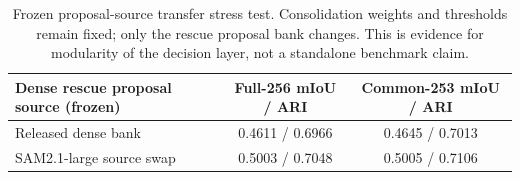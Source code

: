 \begin{table}[t]
\centering
\scriptsize
\begin{tabularx}{\textwidth}{@{}Xcc@{}}
\toprule
Dense rescue proposal source (frozen) & Full-256 mIoU / ARI & Common-253 mIoU / ARI \\
\midrule
Released dense bank & 0.4611 / 0.6966 & 0.4645 / 0.7013 \\
SAM2.1-large source swap & 0.5003 / 0.7048 & 0.5005 / 0.7106 \\
\bottomrule
\end{tabularx}
\caption{Frozen proposal-source transfer stress test. Consolidation weights and thresholds remain fixed; only the rescue proposal bank changes. This is evidence for modularity of the decision layer, not a standalone benchmark claim.}
\label{tab:proposal_swap}
\end{table}
